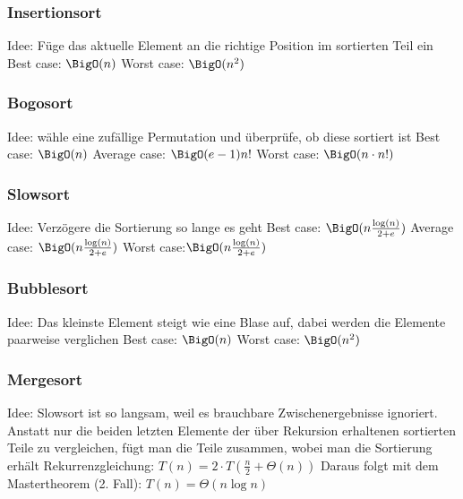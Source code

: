 \documentclass[a4paper]{article}
\begin{document}
	\subsubsection{Insertionsort}
	Idee: Füge das aktuelle Element an die richtige Position im sortierten Teil ein \newline \newline
	Best case: $\BigO(n)$ \newline
	Worst case: $\BigO(n^2)$
	\subsubsection{Bogosort}
	Idee: wähle eine zufällige Permutation und überprüfe, ob diese sortiert ist \newline \newline
	Best case: $\BigO(n)$ \newline
	Average case: $\BigO(e-1)n!$ \newline
	Worst case: $\BigO(n\cdot n!)$
	\subsubsection{Slowsort}
	Idee: Verzögere die Sortierung so lange es geht \newline \newline
	Best case: $\BigO(n\frac{\log(n)}{2+e})$ \newline
	Average case: $\BigO(n\frac{\log(n)}{2+e})$ \newline
	Worst case:$\BigO(n\frac{\log(n)}{2+e})$
	\subsubsection{Bubblesort}
	Idee: Das kleinste Element steigt wie eine Blase auf, dabei werden die Elemente paarweise verglichen \newline \newline
	Best case: $\BigO(n)$ \newline
	Worst case: $\BigO(n^2)$
	\subsubsection{Mergesort}
	Idee: Slowsort ist so langsam, weil es brauchbare Zwischenergebnisse ignoriert. Anstatt nur die beiden  letzten Elemente der über Rekursion erhaltenen sortierten Teile zu vergleichen, fügt man die Teile zusammen, wobei man die Sortierung erhält \newline \newline
	Rekurrenzgleichung: $T(n)=2\cdot T(\frac{n}{2}+\Theta(n))$ \newline
	Daraus folgt mit dem Mastertheorem (2. Fall): $T(n)=\Theta(n\log n)$
\end{document}
